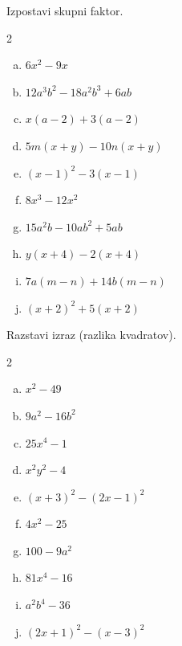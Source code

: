 \documentclass[a4paper,12pt]{letter}
\newcounter{tocke}
\begin{document}
\begin{naloga}[\hfill $\tockeF$] \addtocounter{tocke}{\numexpr\tockeF\relax}
Izpostavi skupni faktor.
\begin{multicols}{2}
\begin{enumerate}[a)]
\item $\displaystyle 6x^2-9x$
\item $\displaystyle 12a^3b^2-18a^2b^3+6ab$
\item $\displaystyle x(a-2)+3(a-2)$
\item $\displaystyle 5m(x+y)-10n(x+y)$
\item $\displaystyle (x-1)^2-3(x-1)$
\end{enumerate}
\columnbreak
\begin{enumerate}[a)]\setcounter{enumi}{5}
\item $\displaystyle 8x^3-12x^2$
\item $\displaystyle 15a^2b-10ab^2+5ab$
\item $\displaystyle y(x+4)-2(x+4)$
\item $\displaystyle 7a(m-n)+14b(m-n)$
\item $\displaystyle (x+2)^2+5(x+2)$
\end{enumerate}
\end{multicols}
\end{naloga}
\newpage

\begin{naloga}[\hfill $\tockeG$] \addtocounter{tocke}{\numexpr\tockeG\relax}
Razstavi izraz (razlika kvadratov).
\begin{multicols}{2}
\begin{enumerate}[a)]
\item $\displaystyle x^2-49$
\item $\displaystyle 9a^2-16b^2$
\item $\displaystyle 25x^4-1$
\item $\displaystyle x^2y^2-4$
\item $\displaystyle (x+3)^2-(2x-1)^2$
\end{enumerate}
\columnbreak
\begin{enumerate}[a)]\setcounter{enumi}{5}
\item $\displaystyle 4x^2-25$
\item $\displaystyle 100-9a^2$
\item $\displaystyle 81x^4-16$
\item $\displaystyle a^2b^4-36$
\item $\displaystyle (2x+1)^2-(x-3)^2$
\end{enumerate}
\end{multicols}
\end{naloga}
\end{document}
